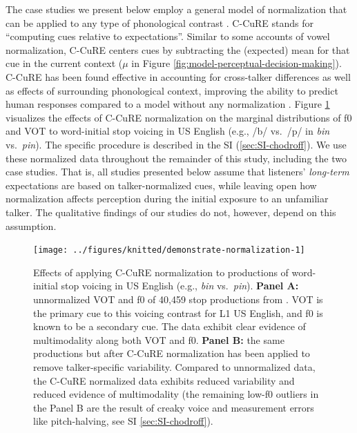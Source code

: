 \documentclass[
  11pt,
  man,floatsintext]{apa6}
\begin{document}
The case studies we present below employ a general model of normalization that can be applied to any type of phonological contrast \autocites[C-CuRE,][]{cole2010,mcmurray-jongman2011}. C-CuRE stands for ``computing cues relative to expectations''. Similar to some accounts of vowel normalization, C-CuRE centers cues by subtracting the (expected) mean for that cue in the current context (\(\mu\) in Figure \ref{fig:model-perceptual-decision-making}). C-CuRE has been found effective in accounting for cross-talker differences as well as effects of surrounding phonological context, improving the ability to predict human responses compared to a model without any normalization \autocites{mcmurray-jongman2011}[see also][]{apfelbaum-mcmurray2015,crinnion2020,kleinschmidt2020,mcmurray-jongman2016,xie2021cognition}. Figure \ref{fig:demonstrate-normalization} visualizes the effects of C-CuRE normalization on the marginal distributions of f0 and VOT to word-initial stop voicing in US English (e.g., /b/ vs.~/p/ in \emph{bin} vs.~\emph{pin}). The specific procedure is described in the SI (\ref{sec:SI-chodroff}). We use these normalized data throughout the remainder of this study, including the two case studies. That is, all studies presented below assume that listeners' \emph{long-term} expectations are based on talker-normalized cues, while leaving open how normalization affects perception during the initial exposure to an unfamiliar talker. The qualitative findings of our studies do not, however, depend on this assumption.



\begin{figure}

{\centering \texttt{[image: ../figures/knitted/demonstrate-normalization-1]} 

}

\caption{Effects of applying C-CuRE normalization to productions of word-initial stop voicing in US English (e.g., \emph{bin} vs.~\emph{pin}). \textbf{Panel A:} unnormalized VOT and f0 of 40,459 stop productions from \textcite{chodroff-wilson2018}. VOT is the primary cue to this voicing contrast for L1 US English, and f0 is known to be a secondary cue. The data exhibit clear evidence of multimodality along both VOT and f0. \textbf{Panel B:} the same productions but after C-CuRE normalization has been applied to remove talker-specific variability. Compared to unnormalized data, the C-CuRE normalized data exhibits reduced variability and reduced evidence of multimodality (the remaining low-f0 outliers in the Panel B are the result of creaky voice and measurement errors like pitch-halving, see SI \ref{sec:SI-chodroff}).}\label{fig:demonstrate-normalization}
\end{figure}
\end{document}
